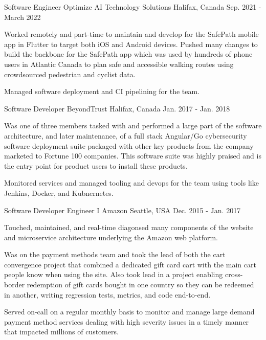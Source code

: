 
\begin{cventries}

  \cventry
    {Software Engineer} %
    {Optimize AI Technology Solutions} %
    {Halifax, Canada} %
    {Sep. 2021 - March 2022} %
    {
      \begin{cvitems}
        \item {Worked remotely and part-time to maintain and develop for the SafePath mobile app in Flutter to target both iOS and Android devices. Pushed many changes to build the backbone for the SafePath app which was used by hundreds of phone users in Atlantic Canada to plan safe and accessible walking routes using crowdsourced pedestrian and cyclist data.}
        \item {Managed software deployment and CI pipelining for the team.}
      \end{cvitems}
    }

  \cventry
    {Software Developer} %
    {BeyondTrust} %
    {Halifax, Canada} %
    {Jan. 2017 - Jan. 2018} %
    {
      \begin{cvitems}
        \item {Was one of three members tasked with and performed a large part of the software architecture, and later maintenance, of a full stack Angular/Go cybersecurity software deployment suite packaged with other key products from the company marketed to Fortune 100 companies. This software suite was highly praised and is the entry point for product users to install these products.}
        \item {Monitored services and managed tooling and devops for the team using tools like Jenkins, Docker, and Kubnernetes.}
      \end{cvitems}
    }

  \cventry
    {Software Developer Engineer I} %
    {Amazon} %
    {Seattle, USA} %
    {Dec. 2015 - Jan. 2017} %
    {
      \begin{cvitems} %
        \item {Touched, maintained, and real-time diagonsed many components of the website and microservice architecture underlying the Amazon web platform.}
        \item {Was on the payment methods team and took the lead of both the cart convergence project that combined a dedicated gift card cart with the main cart people know when using the site. Also took lead in a project enabling cross-border redemption of gift cards bought in one country so they can be redeemed in another, writing regression tests, metrics, and code end-to-end.}
        \item {Served on-call on a regular monthly basis to monitor and manage large demand payment method services dealing with high severity issues in a timely manner that impacted millions of customers.}
      \end{cvitems}
    }

\end{cventries}
